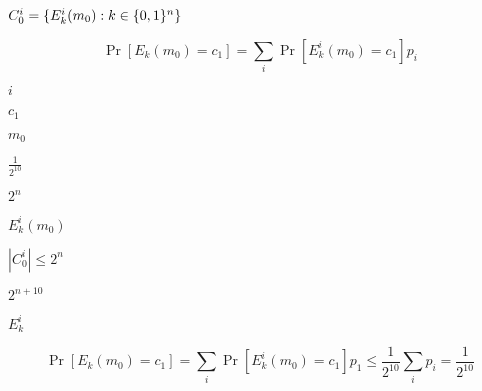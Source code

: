 \documentclass[10pt]{book}
\begin{document}
\begin{mdSnippets}
\begin{mdInlineSnippet}%
$C_0^i = \{E^{i}_k(m_0) : k \in \{0,1\}^n\}$\end{mdInlineSnippet}%
\begin{mdDisplaySnippet}[13c41aa6ce56df97e6a5ba9951ced45e]%
\[%
\Pr[E_k(m_0) = c_1] = \sum_{i} \Pr[E^i_k(m_0) = c_1] p_i
\]%
\end{mdDisplaySnippet}%
\begin{mdInlineSnippet}[865c0c0b4ab0e063e5caa3387c1a8741]%
$i$\end{mdInlineSnippet}%
\begin{mdInlineSnippet}%
$c_1$\end{mdInlineSnippet}%
\begin{mdInlineSnippet}[fed1e4775925bd3f7af0c5d8fc47e4e6]%
$m_0$\end{mdInlineSnippet}%
\begin{mdInlineSnippet}%
$\frac{1}{2^10}$\end{mdInlineSnippet}%
\begin{mdInlineSnippet}[d1db0d9c696a8c056e7117dbbb4ef6db]%
$2^n$\end{mdInlineSnippet}%
\begin{mdInlineSnippet}[13558f77cb0b974652d51ac7a43f466e]%
$E^i_k(m_0)$\end{mdInlineSnippet}%
\begin{mdInlineSnippet}[a36440f574770843a45de3cb29dce8bd]%
$|C_0^i| \leq 2^n$\end{mdInlineSnippet}%
\begin{mdInlineSnippet}%
$2^{n+10}$\end{mdInlineSnippet}%
\begin{mdInlineSnippet}[8b204ff531f8a7d3f7d599ca2adc3430]%
$E^i_k$\end{mdInlineSnippet}%
\begin{mdDisplaySnippet}%
\[%
\Pr[E_k(m_0) = c_1] = \sum_i \Pr[E^i_k(m_0) = c_1] p_1 \leq \frac{1}{2^10} \sum_i p_i = \frac{1}{2^10}
\]%
\end{mdDisplaySnippet}%

\end{mdSnippets}
\end{document}
